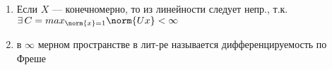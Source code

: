 \newpage

\begin{remark}

\quad

\begin{enumerate}
    \item  Если $X$ --- конечномерно, то из линейности следует непр., т.к. $\exists \, C = max_{\norm{x} = 1} \norm{Ux} < \infty$
    \item \begin{definition}
        в $\infty$ мерном пространстве в лит-ре называется дифференцируемость по Фреше
    \end{definition}
\end{enumerate}
   
\end{remark}

